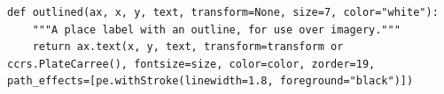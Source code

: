 \begin{lstlisting}[firstnumber=110]
def outlined(ax, x, y, text, transform=None, size=7, color="white"):
    """A place label with an outline, for use over imagery."""
    return ax.text(x, y, text, transform=transform or ccrs.PlateCarree(), fontsize=size, color=color, zorder=19, path_effects=[pe.withStroke(linewidth=1.8, foreground="black")])
\end{lstlisting}
